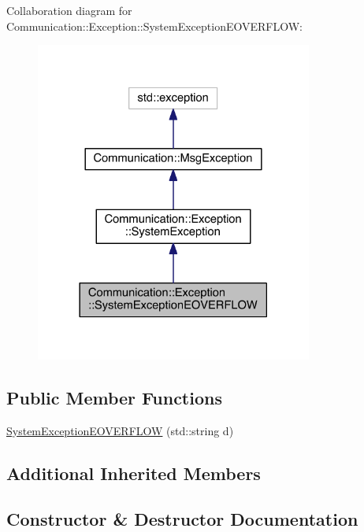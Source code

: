 Collaboration diagram for Communication\+:\+:Exception\+:\+:System\+Exception\+E\+O\+V\+E\+R\+F\+L\+O\+W\+:\nopagebreak
\begin{figure}[H]
\begin{center}
\leavevmode
\includegraphics[width=258pt]{class_communication_1_1_exception_1_1_system_exception_e_o_v_e_r_f_l_o_w__coll__graph}
\end{center}
\end{figure}
\subsection*{Public Member Functions}
\begin{DoxyCompactItemize}
\item 
\hyperlink{class_communication_1_1_exception_1_1_system_exception_e_o_v_e_r_f_l_o_w_a3bba2ae969ef7419f3435ec4bb39d7ee}{System\+Exception\+E\+O\+V\+E\+R\+F\+L\+O\+W} (std\+::string d)
\end{DoxyCompactItemize}
\subsection*{Additional Inherited Members}


\subsection{Constructor \& Destructor Documentation}
\hypertarget{class_communication_1_1_exception_1_1_system_exception_e_o_v_e_r_f_l_o_w_a3bba2ae969ef7419f3435ec4bb39d7ee}{}
